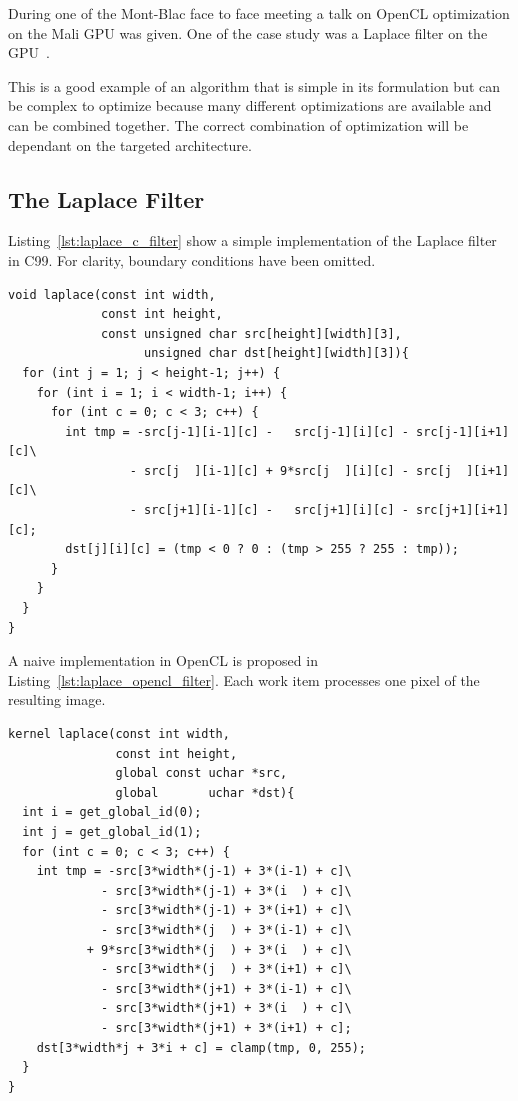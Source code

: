 \documentclass[11pt, a4paper, twoside]{montblanc}
\begin{document}
During one of the Mont-Blac face to face meeting a talk on OpenCL optimization
on the Mali GPU was given. One of the case study was a Laplace filter on the
GPU~\cite{opencl_arm_training}.

This is a good example of an algorithm that is simple in its formulation but can
be complex to optimize because many different optimizations are available and
can be combined together. The correct combination of optimization will be
dependant on the targeted architecture.

\subsection{The Laplace Filter}

Listing~\ref{lst:laplace_c_filter} show a simple implementation of the Laplace
filter in C99. For clarity, boundary conditions have been omitted.

\begin{lstlisting}
void laplace(const int width,
             const int height,
             const unsigned char src[height][width][3],
                   unsigned char dst[height][width][3]){
  for (int j = 1; j < height-1; j++) {
    for (int i = 1; i < width-1; i++) {
      for (int c = 0; c < 3; c++) {
        int tmp = -src[j-1][i-1][c] -   src[j-1][i][c] - src[j-1][i+1][c]\
                 - src[j  ][i-1][c] + 9*src[j  ][i][c] - src[j  ][i+1][c]\
                 - src[j+1][i-1][c] -   src[j+1][i][c] - src[j+1][i+1][c];
        dst[j][i][c] = (tmp < 0 ? 0 : (tmp > 255 ? 255 : tmp));
      }
    }
  }
}
\end{lstlisting}

A naive implementation in OpenCL is proposed in
Listing~\ref{lst:laplace_opencl_filter}. Each work item processes one pixel of
the resulting image.

\begin{lstlisting}
kernel laplace(const int width,
               const int height,
               global const uchar *src,
               global       uchar *dst){
  int i = get_global_id(0);
  int j = get_global_id(1);
  for (int c = 0; c < 3; c++) {
    int tmp = -src[3*width*(j-1) + 3*(i-1) + c]\
             - src[3*width*(j-1) + 3*(i  ) + c]\
             - src[3*width*(j-1) + 3*(i+1) + c]\
             - src[3*width*(j  ) + 3*(i-1) + c]\
           + 9*src[3*width*(j  ) + 3*(i  ) + c]\
             - src[3*width*(j  ) + 3*(i+1) + c]\
             - src[3*width*(j+1) + 3*(i-1) + c]\
             - src[3*width*(j+1) + 3*(i  ) + c]\
             - src[3*width*(j+1) + 3*(i+1) + c];
    dst[3*width*j + 3*i + c] = clamp(tmp, 0, 255);
  }
}
\end{lstlisting}
\end{document}
